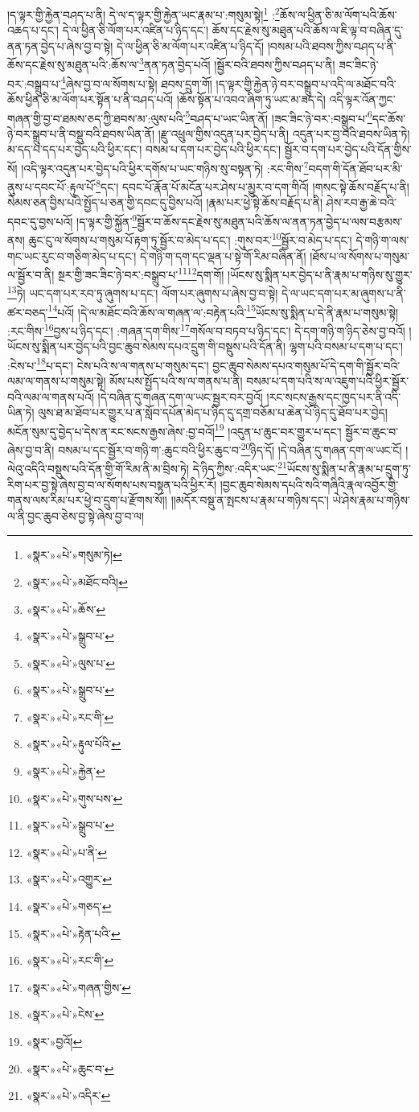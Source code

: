 །ད་ལྟར་གྱི་རྐྱེན་བཤད་པ་ནི། དེ་ལ་ད་ལྟར་གྱི་རྐྱེན་ཡང་རྣམ་པ་:གསུམ་སྟེ།\footnote{«སྣར་»«པེ་»གསུམ་ཏེ།} :\footnote{«སྣར་»«པེ་»མཐོང་བའི། }ཆོས་ལ་ཕྱིན་ཅི་མ་ལོག་པའི་ཆོས་འཆད་པ་དང་། དེ་ལ་ཕྱིན་ཅི་ལོག་པར་འཛིན་པ་ཉིད་དང་། ཆོས་དང་རྗེས་སུ་མཐུན་པའི་ཆོས་ལ་ཇི་ལྟ་བ་བཞིན་དུ་ནན་ཏན་བྱེད་པ་ཞེས་བྱ་བ་སྟེ། དེ་ལ་ཕྱིན་ཅི་མ་ལོག་པར་འཛིན་པ་ཉིད་དོ། །བསམ་པའི་ཐབས་ཀྱིས་བཤད་པ་ནི་ཆོས་དང་རྗེས་སུ་མཐུན་པའི་:ཆོས་ལ་\footnote{«སྣར་»«པེ་»ཆོས་}ནན་ཏན་བྱེད་པའོ། །སྦྱོར་བའི་ཐབས་ཀྱིས་བཤད་པ་ནི། ཟང་ཟིང་ཉེ་བར་:བསྒྲུབ་པ་\footnote{«སྣར་»«པེ་»སྒྲུབ་པ་}ཞེས་བྱ་བ་ལ་སོགས་པ་སྟེ། ཐབས་དྲུག་གོ། །ད་ལྟར་གྱི་རྐྱེན་ཉེ་བར་བསྒྲུབ་པ་འདི་ལ་མཐོང་བའི་ཆོས་ཕྱིན་ཅི་མ་ལོག་པར་སྟོན་པ་ནི་བཤད་པའོ། །ཆོས་སྟོན་པ་འབའ་ཞིག་ཏུ་ཡང་མ་ཟད་དེ། འདི་ལྟར་འོན་ཀྱང་གཞན་གྱི་བྱ་བ་ཐམས་ཅད་ཀྱི་ཐབས་མ་:ལུས་པའི་\footnote{«སྣར་»«པེ་»ལུས་པ་}བཤད་པ་ཡང་ཡིན་ནོ། །ཟང་ཟིང་ཉེ་བར་:བསྒྲུབ་པ་\footnote{«སྣར་»«པེ་»སྒྲུབ་པ་}དང་ཆོས་ཉེ་བར་སྒྲུབ་པ་ནི་བསྡུ་བའི་ཐབས་ཡིན་ནོ། །རྫུ་འཕྲུལ་གྱིས་འདུན་པར་བྱེད་པ་ནི། འདུན་པར་བྱ་བའི་ཐབས་ཡིན་ཏེ། མ་དད་པ་དད་པར་བྱེད་པའི་ཕྱིར་དང་། བསམ་པ་དག་པར་བྱེད་པའི་ཕྱིར་དང་། སྦྱོར་བ་དག་པར་བྱེད་པའི་དོན་གྱིས་སོ། །འདི་ལྟར་འདུན་པར་བྱེད་པའི་ཕྱིར་དགོས་པ་ཡང་གཉིས་སུ་བསྟན་ཏེ། :རང་གིས་\footnote{«སྣར་»«པེ་»རང་གི་}བདག་གི་དོན་ཐོབ་པར་མི་ནུས་པ་དབང་པོ་:རྟུལ་པོ་\footnote{«སྣར་»«པེ་»རྟུལ་པོའི་}དང་། དབང་པོ་རྣོན་པོ་མངོན་པར་ཤེས་པ་མྱུར་བ་དག་གིའོ། །གསང་སྟེ་ཆོས་བརྗོད་པ་ནི། སེམས་ཅན་བྱིས་པའི་སྤྱོད་པ་ཅན་གྱི་དབང་དུ་བྱིས་པའོ། །རྣམ་པར་ཕྱེ་སྟེ་ཆོས་བརྗོད་པ་ནི། ཤེས་རབ་རྒྱ་ཆེ་བའི་དབང་དུ་བྱས་པའོ། །ད་ལྟར་གྱི་སྐྱོན་\footnote{«སྣར་»«པེ་»རྐྱེན་}སྦྱོར་བ་ཆོས་དང་རྗེས་སུ་མཐུན་པའི་ཆོས་ལ་ནན་ཏན་བྱེད་པ་ལས་བརྩམས་ནས། ཆུང་ངུ་ལ་སོགས་པ་གསུམ་པོ་རྟག་ཏུ་སྦྱོར་བ་མེད་པ་དང་། :གུས་བར་\footnote{«སྣར་»«པེ་»གུས་པས་}སྦྱོར་བ་མེད་པ་དང་། དེ་གཉི་ག་ལས་གང་ཡང་རུང་བ་གཅིག་མེད་པ་དང་། དེ་གཉི་ག་དག་དང་ལྡན་པ་སྟེ་གོ་རིམ་བཞིན་ནོ། །ཐོས་པ་ལ་སོགས་པ་གསུམ་ལ་སྦྱོར་བ་ནི། སྔར་གྱི་ཟང་ཟིང་ཉེ་བར་:བསྒྲུབ་པ་\footnote{«སྣར་»«པེ་»སྒྲུབ་པ་}\footnote{«སྣར་»«པེ་»པ་ནི་}དག་གོ། །ཡོངས་སུ་སྨིན་པར་བྱེད་པ་ནི་རྣམ་པ་གཉིས་སུ་གྱུར་\footnote{«སྣར་»«པེ་»འགྱུར་}ཏེ། ཡང་དག་པར་རབ་ཏུ་ཞུགས་པ་དང་། ལོག་པར་ཞུགས་པ་ཞེས་བྱ་བ་སྟེ། དེ་ལ་ཡང་དག་པར་མ་ཞུགས་པ་ནི་ཚར་བཅད་\footnote{«སྣར་»«པེ་»གཅད་}པའོ། །དེ་ལ་མཐོང་བའི་ཆོས་ལ་གཞན་ལ་:བརྟེན་པའི་\footnote{«སྣར་»«པེ་»རྟེན་པའི་}ཡོངས་སུ་སྨིན་པ་དེ་ནི་རྣམ་པ་གསུམ་སྟེ། :རང་གིས་\footnote{«སྣར་»«པེ་»རང་གི་}བྱས་པ་ཉིད་དང་། :གཞན་དག་གིས་\footnote{«སྣར་»«པེ་»གཞན་གྱིས་}གསོལ་བ་བཏབ་པ་ཉིད་དང་། དེ་དག་གཉི་ག་ཉིད་ཅེས་བྱ་བའོ། །ཡོངས་སུ་སྨིན་པར་བྱེད་པའི་བྱང་ཆུབ་སེམས་དཔའ་དྲུག་གི་བསྡུས་པའི་དོན་ནི། ལྷག་པའི་བསམ་པ་དག་པ་དང་། :ངེས་པ་\footnote{«སྣར་»«པེ་»ངེས་}པ་དང་། ངེས་པའི་ས་ལ་གནས་པ་གསུམ་དང་། བྱང་ཆུབ་སེམས་དཔའ་གསུམ་པོ་དེ་དག་གི་སྦྱོར་བའི་ལམ་ལ་གནས་པ་གསུམ་སྟེ། མོས་པས་སྤྱོད་པའི་ས་ལ་གནས་པ་ནི། བསམ་པ་དག་པའི་ས་ལ་འཇུག་པའི་ཕྱིར་སྦྱོར་བའི་ལམ་ལ་གནས་པའོ། །དེ་བཞིན་དུ་གཞན་དག་ལ་ཡང་སྦྱར་བར་བྱའོ། །རང་སངས་རྒྱས་དང་ཁྱད་པར་ནི་འདི་ཡིན་ཏེ། ལུས་ཐ་མ་ཐོབ་པར་གྱུར་པ་ན་སློབ་དཔོན་མེད་པ་ཉིད་དུ་དགྲ་བཅོམ་པ་ཆེན་པོ་ཉིད་དུ་ཐོབ་པར་བྱེད། མངོན་སུམ་དུ་བྱེད་པ་དེས་ན་རང་སངས་རྒྱས་ཞེས་:བྱ་བའོ།\footnote{«སྣར་»བྱའོ།} །འདུན་པ་ཆུང་བར་གྱུར་པ་དང་། སྦྱོར་བ་ཆུང་བ་ཞེས་བྱ་བ་ནི། བསམ་པ་དང་སྦྱོར་བ་གཉི་ག་:ཆུང་བའི་ཕྱིར་ཆུང་བ་\footnote{«སྣར་»«པེ་»ཆུང་བ་}ཉིད་དོ། །དེ་བཞིན་དུ་གཞན་དག་ལ་ཡང་ངོ། །ལེའུ་འདིའི་བསྡུས་པའི་དོན་གྱི་གོ་རིམ་ནི་མ་བྲིས་ཏེ། དེ་ཉིད་ཀྱིས་:འདིར་ཡང་\footnote{«སྣར་»«པེ་»འདིར་}ཡོངས་སུ་སྨིན་པ་ནི་རྣམ་པ་དྲུག་ཏུ་རིག་པར་བྱ་སྟེ་ཞེས་བྱ་བ་ལ་སོགས་པས་བསྟན་པའི་ཕྱིར་རོ། །བྱང་ཆུབ་སེམས་དཔའི་སའི་གཞིའི་རྣལ་འབྱོར་གྱི་གནས་ལས་རིམ་པར་ཕྱེ་བ་དྲུག་པ་རྫོགས་སོ།། །།མདོར་བསྡུ་ན་སྤངས་པ་རྣམ་པ་གཉིས་དང་། ཡེ་ཤེས་རྣམ་པ་གཉིས་ལ་ནི་བྱང་ཆུབ་ཅེས་བྱ་སྟེ་ཞེས་བྱ་བ་ལ། 
